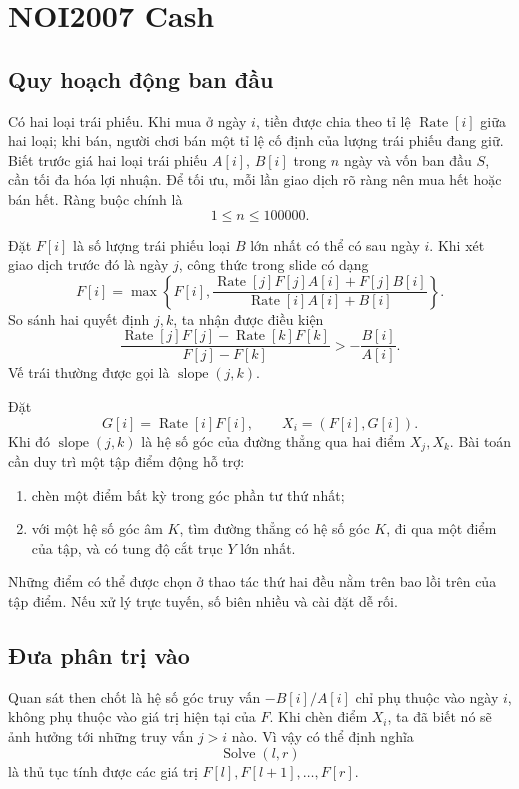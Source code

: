 \documentclass[11pt]{article}
\newcommand{\Solve}{\operatorname{Solve}}
\newcommand{\slope}{\operatorname{slope}}
\begin{document}
\section{NOI2007 Cash}

\subsection{Quy hoạch động ban đầu}

Có hai loại trái phiếu. Khi mua ở ngày \(i\), tiền được chia theo tỉ lệ
\(\operatorname{Rate}[i]\) giữa hai loại; khi bán, người chơi bán một tỉ lệ
cố định của lượng trái phiếu đang giữ. Biết trước giá hai loại trái phiếu
\(A[i]\), \(B[i]\) trong \(n\) ngày và vốn ban đầu \(S\), cần tối đa hóa lợi
nhuận. Để tối ưu, mỗi lần giao dịch rõ ràng nên mua hết hoặc bán hết. Ràng
buộc chính là
\[
  1\le n\le 100000.
\]

Đặt \(F[i]\) là số lượng trái phiếu loại \(B\) lớn nhất có thể có sau ngày
\(i\). Khi xét giao dịch trước đó là ngày \(j\), công thức trong slide có
dạng
\[
  F[i]=\max\left\{F[i],
  \frac{\operatorname{Rate}[j]F[j]A[i]+F[j]B[i]}
       {\operatorname{Rate}[i]A[i]+B[i]}\right\}.
\]
So sánh hai quyết định \(j,k\), ta nhận được điều kiện
\[
  \frac{\operatorname{Rate}[j]F[j]-\operatorname{Rate}[k]F[k]}
       {F[j]-F[k]}
  > -\frac{B[i]}{A[i]}.
\]
Vế trái thường được gọi là \(\slope(j,k)\).

Đặt
\[
  G[i]=\operatorname{Rate}[i]F[i],\qquad X_i=(F[i],G[i]).
\]
Khi đó \(\slope(j,k)\) là hệ số góc của đường thẳng qua hai điểm \(X_j,X_k\).
Bài toán cần duy trì một tập điểm động hỗ trợ:
\begin{enumerate}
  \item chèn một điểm bất kỳ trong góc phần tư thứ nhất;
  \item với một hệ số góc âm \(K\), tìm đường thẳng có hệ số góc \(K\), đi
  qua một điểm của tập, và có tung độ cắt trục \(Y\) lớn nhất.
\end{enumerate}
Những điểm có thể được chọn ở thao tác thứ hai đều nằm trên bao lồi trên của
tập điểm. Nếu xử lý trực tuyến, số biên nhiều và cài đặt dễ rối.

\subsection{Đưa phân trị vào}

Quan sát then chốt là hệ số góc truy vấn \(-B[i]/A[i]\) chỉ phụ thuộc vào
ngày \(i\), không phụ thuộc vào giá trị hiện tại của \(F\). Khi chèn điểm
\(X_i\), ta đã biết nó sẽ ảnh hưởng tới những truy vấn \(j>i\) nào. Vì vậy
có thể định nghĩa
\[
  \Solve(l,r)
\]
là thủ tục tính được các giá trị \(F[l],F[l+1],\ldots,F[r]\).
\end{document}
